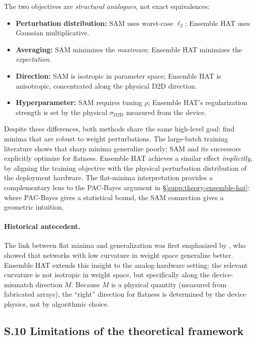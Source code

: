 The two objectives are \emph{structural analogues}, not exact equivalences:
\begin{itemize}
    \item \textbf{Perturbation distribution:} SAM uses worst-case $\ell_2$; Ensemble HAT uses Gaussian multiplicative.
    \item \textbf{Averaging:} SAM minimizes the \emph{maximum}; Ensemble HAT minimizes the \emph{expectation}.
    \item \textbf{Direction:} SAM is isotropic in parameter space; Ensemble HAT is anisotropic, concentrated along the physical D2D direction.
    \item \textbf{Hyperparameter:} SAM requires tuning $\rho$; Ensemble HAT's regularization strength is set by the physical $\sigma_{\text{D2D}}$ measured from the device.
\end{itemize}

Despite these differences, both methods share the same high-level goal: find minima that are robust to weight perturbations. The large-batch training literature \citep{keskar2017large} shows that sharp minima generalize poorly; SAM \citep{foret2021sharpness} and its successors \citep{andriushchenko2022understanding} explicitly optimize for flatness. Ensemble HAT achieves a similar effect \emph{implicitly}, by aligning the training objective with the physical perturbation distribution of the deployment hardware. The flat-minima interpretation provides a complementary lens to the PAC-Bayes argument in \S\ref{supp:theory-ensemble-hat}: where PAC-Bayes gives a statistical bound, the SAM connection gives a geometric intuition.

\paragraph{Historical antecedent.} The link between flat minima and generalization was first emphasized by \citet{hochreiter1997flat}, who showed that networks with low curvature in weight space generalize better. Ensemble HAT extends this insight to the analog-hardware setting: the relevant curvature is not isotropic in weight space, but specifically along the device-mismatch direction $M$. Because $M$ is a physical quantity (measured from fabricated arrays), the ``right'' direction for flatness is determined by the device physics, not by algorithmic choice.

\subsection*{S.10 Limitations of the theoretical framework}


